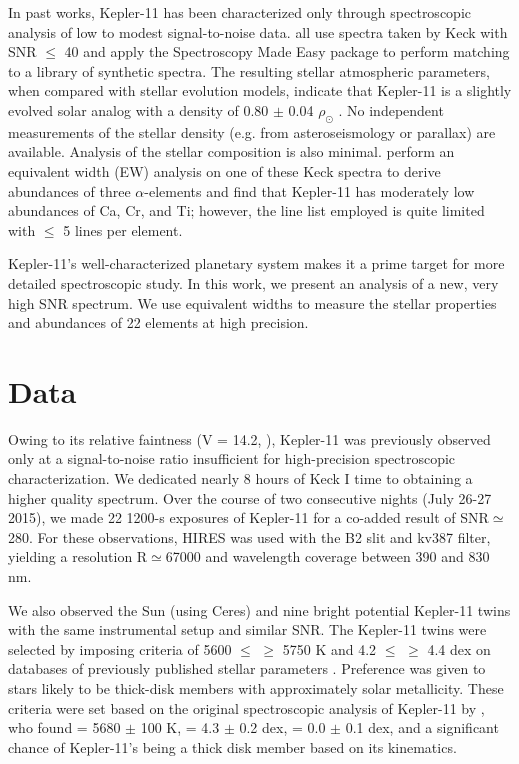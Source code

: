 \documentclass[oneside]{emulateapj}
\begin{document}
In past works, Kepler-11 has been characterized only through spectroscopic analysis of low to modest signal-to-noise data. \citet{Lissauer2011, Lissauer2013, Rowe2014} all use spectra taken by Keck with SNR $\leq$ 40 and apply the Spectroscopy Made Easy package \citep[SME,][]{Valenti1996} to perform matching to a library of synthetic spectra. The resulting stellar atmospheric parameters, when compared with stellar evolution models, indicate that Kepler-11 is a slightly evolved solar analog with a density of 0.80 $\pm$ 0.04 $\rho_{\odot}$ \citep{Lissauer2013}. No independent measurements of the stellar density (e.g. from asteroseismology or parallax) are available. Analysis of the stellar composition is also minimal. \citet{Adibekyan2012b} perform an equivalent width (EW) analysis on one of these Keck spectra to derive abundances of three $\alpha$-elements and find that Kepler-11 has moderately low abundances of Ca, Cr, and Ti; however, the line list employed is quite limited with $\leq$ 5 lines per element.

Kepler-11's well-characterized planetary system makes it a prime target for more detailed spectroscopic study. In this work, we present an analysis of a new, very high SNR spectrum. We use equivalent widths to measure the stellar properties and abundances of 22 elements at high precision.


\section{Data}

Owing to its relative faintness (V = 14.2, \citet{Lissauer2011}), Kepler-11 was previously observed only at a signal-to-noise ratio insufficient for high-precision spectroscopic characterization. We dedicated nearly 8 hours of Keck I time to obtaining a higher quality spectrum. Over the course of two consecutive nights (July 26-27 2015), we made 22 1200-s exposures of Kepler-11 for a co-added result of SNR$\simeq$280. For these observations, HIRES was used with the B2 slit and kv387 filter, yielding a resolution R$\simeq$67000 and wavelength coverage between 390 and 830 nm.

We also observed the Sun (using Ceres) and nine bright potential Kepler-11 twins with the same instrumental setup and similar SNR. The Kepler-11 twins were selected by imposing criteria of 5600 $\leq$ \teff$\geq$ 5750 K and 4.2 $\leq$ \logg $\geq$ 4.4 dex on databases of previously published stellar parameters \citep{Adibekyan2012, Bensby2014}. Preference was given to stars likely to be thick-disk members with approximately solar metallicity. These criteria were set based on the original spectroscopic analysis of Kepler-11 by \citet{Lissauer2011}, who found \teff = 5680 $\pm$ 100 K, \logg = 4.3 $\pm$ 0.2 dex, \feh = 0.0 $\pm$ 0.1 dex, and a significant chance of Kepler-11's being a thick disk member based on its kinematics.
\end{document}
